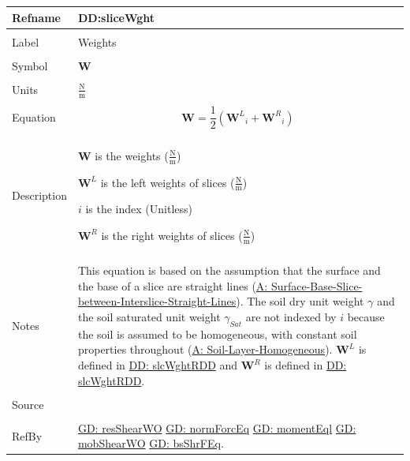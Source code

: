 \documentclass[12pt]{article}
\begin{document}
\noindent \begin{minipage}{\textwidth}
\begin{tabular}{p{} p{}}
\toprule \textbf{Refname} & \textbf{DD:sliceWght}
\label{DD:sliceWght}
\\ \midrule \\
Label & Weights
\\ \midrule \\
Symbol & $\mathbf{W}$
\\ \midrule \\
Units & $\frac{\text{N}}{\text{m}}$
\\ \midrule \\
Equation & \begin{displaymath}
           \mathbf{W}=\frac{1}{2} \left({{\mathbf{W}^{L}}}_{i}+{{\mathbf{W}^{R}}}_{i}\right)
           \end{displaymath}
\\ \midrule \\
Description & \begin{symbDescription}
              \item{$\mathbf{W}$ is the weights ($\frac{\text{N}}{\text{m}}$)}
              \item{${\mathbf{W}^{L}}$ is the left weights of slices ($\frac{\text{N}}{\text{m}}$)}
              \item{$i$ is the index (Unitless)}
              \item{${\mathbf{W}^{R}}$ is the right weights of slices ($\frac{\text{N}}{\text{m}}$)}
              \end{symbDescription}
\\ \midrule \\
Notes & This equation is based on the assumption that the surface and the base of a slice are straight lines (\hyperref[assumpSBSBISL]{A: Surface-Base-Slice-between-Interslice-Straight-Lines}). The soil dry unit weight $γ$ and the soil saturated unit weight ${γ_{Sat}}$ are not indexed by $i$ because the soil is assumed to be homogeneous, with constant soil properties throughout (\hyperref[assumpSLH]{A: Soil-Layer-Homogeneous}). ${\mathbf{W}^{L}}$ is defined in \hyperref[DD:slcWghtRDD]{DD: slcWghtRDD} and ${\mathbf{W}^{R}}$ is defined in \hyperref[DD:slcWghtRDD]{DD: slcWghtRDD}.
\\ \midrule \\
Source & \cite{fredlund1977}
\\ \midrule \\
RefBy & \hyperref[GD:resShearWO]{GD: resShearWO} \hyperref[GD:normForcEq]{GD: normForcEq} \hyperref[GD:momentEql]{GD: momentEql} \hyperref[GD:mobShearWO]{GD: mobShearWO} \hyperref[GD:bsShrFEq]{GD: bsShrFEq}.
\\ \bottomrule \end{tabular}
\end{minipage}
\par~
\end{document}
